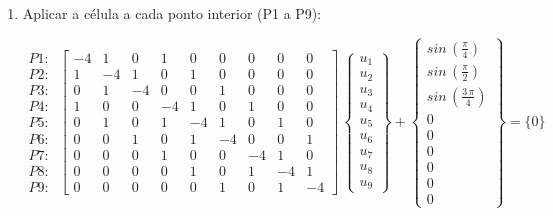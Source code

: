 \begin{enumerate}
\item Aplicar a célula a cada ponto interior (P1 a P9):

\[
\begin{array}{l}
 P1: \\
 P2: \\
 P3: \\
 P4: \\
 P5: \\
 P6: \\
 P7: \\
 P8: \\
 P9:
\end{array}
\,
\left[
\begin{array}{rrrrrrrrr}
 -4 &  1 &  0 &  1 &  0 &  0 &  0 &  0 &  0\\
  1 & -4 &  1 &  0 &  1 &  0 &  0 &  0 &  0\\
  0 &  1 & -4 &  0 &  0 &  1 &  0 &  0 &  0\\
  1 &  0 &  0 & -4 &  1 &  0 &  1 &  0 &  0\\
  0 &  1 &  0 &  1 & -4 &  1 &  0 &  1 &  0\\
  0 &  0 &  1 &  0 &  1 & -4 &  0 &  0 &  1\\
  0 &  0 &  0 &  1 &  0 &  0 & -4 &  1 &  0\\
  0 &  0 &  0 &  0 &  1 &  0 &  1 & -4 &  1\\
  0 &  0 &  0 &  0 &  0 &  1 &  0 &  1 & -4
\end{array}
\right]
\,
\left\{
\begin{array}{l}
 u_1 \\
 u_2 \\
 u_3 \\
 u_4 \\
 u_5 \\
 u_6 \\
 u_7 \\
 u_8 \\
 u_9
\end{array}
\right\}
+
\left\{
\begin{array}{c}
 sin\,\left(\frac{\pi}{4}\right) \\
 sin\,\left(\frac{\pi}{2}\right) \\
 sin\,\left(\frac{3\,\pi}{4}\right) \\
 0 \\
 0 \\
 0 \\
 0 \\
 0 \\
 0
\end{array}
\right\}
=
\{0\}
\]

\end{enumerate}

